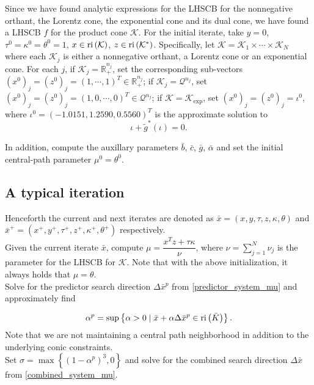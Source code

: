 \documentclass[10pt]{article}
\theoremstyle{definition}
\theoremstyle{plain}
\def\relint{\protect{\textnormal{ri}}}
\begin{document}
Since we have found analytic expressions for the LHSCB for the nonnegative orthant, the Lorentz cone, the exponential cone and its dual cone, we have found a LHSCB $f$ for the product cone $\mathcal{K}$. For the initial iterate, take $y = 0$, $\tau^0 = \kappa^0 = \theta^0 = 1$, $x \in \relint \left(\mathcal{K}\right)$, $z\in\relint\left(\mathcal{K}^*\right)$. Specifically, let $\mathcal{K} = \mathcal{K}_1 \times \cdots \times \mathcal{K}_N$ where each $\mathcal{K}_j$ is either a nonnegative orthant, a Lorentz cone or an exponential cone. For each $j$, if $\mathcal{K}_j = \mathbb{R}_+^{n_j}$, set the corresponding sub-vectors $\left(x^0\right)_j = \left(z^0\right)_j = (1,\cdots, 1)^T \in \mathbb{R}_+^{n_j}$; if $\mathcal{K}_j = \mathcal{Q}^{n_j}$, set $\left(x^0\right)_j = \left(z^0\right)_j = (1,0,\cdots, 0)^T \in \mathcal{Q}^{n_j}$; if $\mathcal{K} = \mathcal{K}_{\exp}$, set $\left(x^0\right)_j = \left(z^0\right)_j = \iota^0$, where $\iota^0 =   (-1.0151, 1.2590, 0.5560)^T$ is the approximate solution to 
\[\iota + \tilde g^*(\iota) = 0.\]

In addition, compute the auxillary parameters $\bar{b}$, $\bar{c}$, $\bar{g}$, $\bar{\alpha}$ and set the initial central-path parameter $\mu^0 = \theta^0$.

\subsection{A typical iteration}\label{A_typical_iteration}
Henceforth the current and next iterates are denoted as  $ \bar x = (x,y, \tau, z,\kappa, \theta)$ and  $ \bar x^+ = (x^+, y^+, \tau^+, z^+,\kappa^+, \theta^+)$ respectively. \\

Given the current iterate $\bar x$, compute $\mu = \dfrac{x^T z + \tau \kappa}{\nu}$, where $\nu = \sum_{j=1}^N \nu_j$ is the parameter for the LHSCB for $\mathcal{K}$. Note that with the above initialization, it always holds that $\mu = \theta$. \\

Solve for the predictor search direction $\Delta \bar x^p$ from \eqref{predictor_system_mu} and approximately find

\[\alpha^p = \sup \left\{ \alpha > 0 \mid \bar x + \alpha \Delta \bar x^p \in \relint \left(\bar K\right)
 \right\}. \]
Note that we are not maintaining a central path neighborhood in addition to the underlying conic constraints. \\

Set $\sigma = \max\left\{(1-\alpha^p)^3, 0\right\}$ and solve for the combined search direction $\Delta \bar x$ from \eqref{combined_system_mu}. \\
\end{document}
